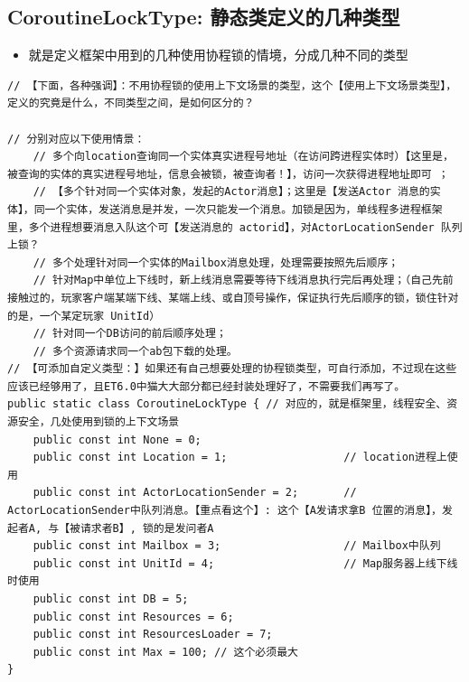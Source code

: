 \documentclass[9pt, b5paper]{article}
\begin{document}
\subsection{CoroutineLockType: 静态类定义的几种类型}
\label{sec-14-1}
\begin{itemize}
\item 就是定义框架中用到的几种使用协程锁的情境，分成几种不同的类型
\end{itemize}
\begin{verbatim}
// 【下面，各种强调】：不用协程锁的使用上下文场景的类型，这个【使用上下文场景类型】，定义的究竟是什么，不同类型之间，是如何区分的？

// 分别对应以下使用情景：
    // 多个向location查询同一个实体真实进程号地址（在访问跨进程实体时）【这里是，被查询的实体的真实进程号地址，信息会被锁，被查询者！】，访问一次获得进程地址即可 ；
    // 【多个针对同一个实体对象，发起的Actor消息】；这里是【发送Actor 消息的实体】，同一个实体，发送消息是并发，一次只能发一个消息。加锁是因为，单线程多进程框架里，多个进程想要消息入队这个可【发送消息的 actorid】，对ActorLocationSender 队列上锁？
    // 多个处理针对同一个实体的Mailbox消息处理，处理需要按照先后顺序；
    // 针对Map中单位上下线时，新上线消息需要等待下线消息执行完后再处理；（自己先前接触过的，玩家客户端某端下线、某端上线、或自顶号操作，保证执行先后顺序的锁，锁住针对的是，一个某定玩家 UnitId）
    // 针对同一个DB访问的前后顺序处理；
    // 多个资源请求同一个ab包下载的处理。
// 【可添加自定义类型：】如果还有自己想要处理的协程锁类型，可自行添加，不过现在这些应该已经够用了，且ET6.0中猫大大部分都已经封装处理好了，不需要我们再写了。
public static class CoroutineLockType { // 对应的，就是框架里，线程安全、资源安全，几处使用到锁的上下文场景
    public const int None = 0;
    public const int Location = 1;                  // location进程上使用
    public const int ActorLocationSender = 2;       // ActorLocationSender中队列消息。【重点看这个】: 这个【A发请求拿B 位置的消息】，发起者A, 与【被请求者B】, 锁的是发问者A
    public const int Mailbox = 3;                   // Mailbox中队列
    public const int UnitId = 4;                    // Map服务器上线下线时使用
    public const int DB = 5;
    public const int Resources = 6;
    public const int ResourcesLoader = 7;
    public const int Max = 100; // 这个必须最大
}
\end{verbatim}
\end{document}
